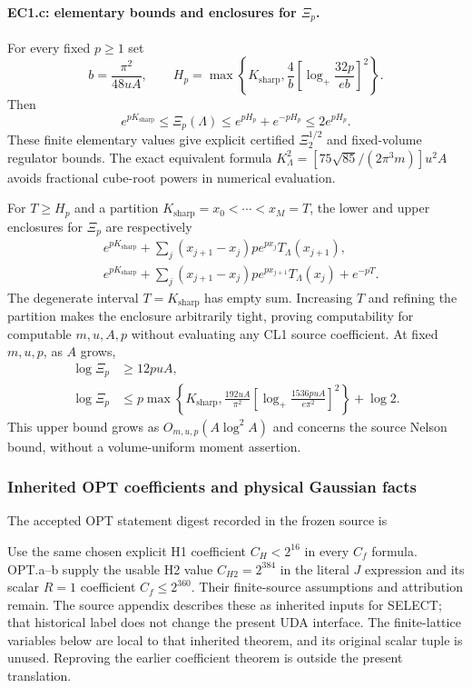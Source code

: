 \documentclass[11pt]{article}
\theoremstyle{plain}
\theoremstyle{definition}
\theoremstyle{remark}
\begin{document}
\paragraph{EC1.c: elementary bounds and enclosures for $\Xi_p$.}
For every fixed $p\ge1$ set
\[
 b=\frac{\pi^2}{48uA},\qquad
 H_p=\max\left\{K_{\mathrm{sharp}},\frac4b
                      \left[\log_+\frac{32p}{eb}\right]^2\right\}.
\]
Then
\[
 e^{pK_{\mathrm{sharp}}}\le\Xi_p(\Lambda)
 \le e^{pH_p}+e^{-pH_p}\le2e^{pH_p}.
\]
These finite elementary values give explicit certified
$\Xi_2^{1/2}$ and fixed-volume regulator bounds. The exact equivalent
formula $K_\Lambda^2=[75\sqrt{85}/(2\pi^3m)]u^2A$ avoids fractional
cube-root powers in numerical evaluation.

For $T\ge H_p$ and a partition $K_{\mathrm{sharp}}=x_0<\cdots<x_M=T$,
the lower and upper enclosures for $\Xi_p$ are respectively
\begin{align*}
 &e^{pK_{\mathrm{sharp}}}
   +\sum_j(x_{j+1}-x_j)pe^{px_j}T_\Lambda(x_{j+1}),\\
 &e^{pK_{\mathrm{sharp}}}
   +\sum_j(x_{j+1}-x_j)pe^{px_{j+1}}T_\Lambda(x_j)+e^{-pT}.
\end{align*}
The degenerate interval $T=K_{\mathrm{sharp}}$ has empty sum.
Increasing $T$ and refining the partition makes the enclosure arbitrarily
tight, proving computability for computable $m,u,A,p$ without evaluating
any CL1 source coefficient. At fixed $m,u,p$, as $A$ grows,
\begin{align*}
 \log\Xi_p&\ge12puA,\\
 \log\Xi_p&\le p\max\left\{K_{\mathrm{sharp}},\frac{192uA}{\pi^2}
           \left[\log_+\frac{1536puA}{e\pi^2}\right]^2\right\}+\log2.
\end{align*}
This upper bound grows as $O_{m,u,p}(A\log^2A)$ and concerns the source
Nelson bound, without a volume-uniform moment assertion.

\subsubsection{Inherited OPT coefficients and physical Gaussian facts}
The accepted OPT statement digest recorded in the frozen source is
\par{}\par
Use the same chosen explicit H1 coefficient $C_H<2^{16}$ in every
$C_f$ formula. OPT.a--b supply the usable H2 value $C_{H2}=2^{384}$
in the literal $J$ expression and its scalar $R=1$ coefficient
$C_f\le2^{360}$. Their finite-source assumptions and attribution remain.
The source appendix describes these as inherited inputs for SELECT;
that historical label does not change the present UDA interface. The
finite-lattice variables below are local to that inherited theorem,
and its original scalar tuple is unused. Reproving the earlier coefficient
theorem is outside the present translation.
\end{document}
